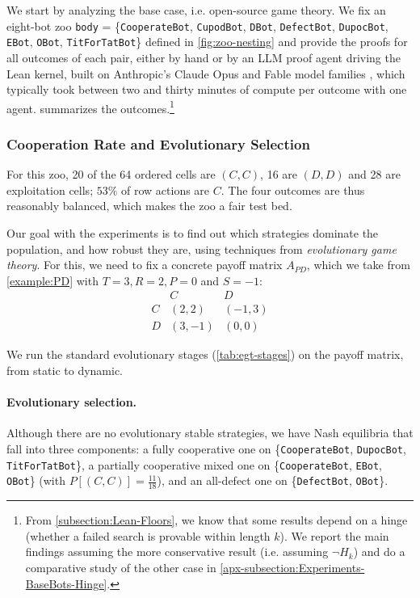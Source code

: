 \documentclass[twoside,11pt]{article}
\begin{document}
We start by analyzing the base case, i.e. open-source game theory. We fix an eight-bot zoo \texttt{body} = \{\texttt{CooperateBot}, \texttt{CupodBot}, \texttt{DBot}, \texttt{DefectBot}, \texttt{DupocBot}, \texttt{EBot}, \texttt{OBot}, \texttt{TitForTatBot}\} defined in \cref{fig:zoo-nesting} and provide the proofs for all outcomes of each pair, either by hand or by an LLM proof agent driving the Lean kernel, built on Anthropic's Claude Opus and Fable model families \citep{anthropic2026fable51,anthropic2026opus48}, which typically took between two and thirty minutes of compute per outcome with one agent.  summarizes the outcomes.\footnote{From \cref{subsection:Lean-Floors}, we know that some results depend on a hinge (whether a failed search is provable within length $k$). We report the main findings assuming the more conservative result (i.e. assuming $\neg H_k$) and do a comparative study of the other case in \cref{apx-subsection:Experiments-BaseBots-Hinge}.}

 

\subsubsection{Cooperation Rate and Evolutionary Selection}
\label{subsubsection:Results-Base-Analysis}

For this zoo, 20 of the 64 ordered cells are $(C,C)$, 16 are $(D,D)$ and 28 are exploitation cells; $53\%$ of row actions are $C$. The four outcomes are thus reasonably balanced, which makes the zoo a fair test bed. 

Our goal with the experiments is to find out which strategies dominate the population, and how robust they are, using techniques from \emph{evolutionary game theory}. For this, we need to fix a concrete payoff matrix $A_{PD}$, which we take from \cref{example:PD} with $T = 3, R = 2, P=0$ and $S = -1$:
\[
\begin{array}{c|cc}
       & C & D \\ \hline
     C & (2,2) & (-1,3) \\
     D & (3,-1) & (0,0)
  \end{array}
\]

We run the standard evolutionary stages (\cref{tab:egt-stages}) on the payoff matrix, from static to dynamic.


\paragraph{Evolutionary selection.} Although there are no evolutionary stable strategies, we have Nash equilibria that fall into three components: a fully cooperative one on \{\texttt{CooperateBot}, \texttt{DupocBot}, \texttt{TitForTatBot}\}, a partially cooperative mixed one on \{\texttt{CooperateBot}, \texttt{EBot}, \texttt{OBot}\} (with $P[(C,C)] = \frac{11}{18}$), and an all-defect one on \{\texttt{DefectBot}, \texttt{OBot}\}.
\end{document}
